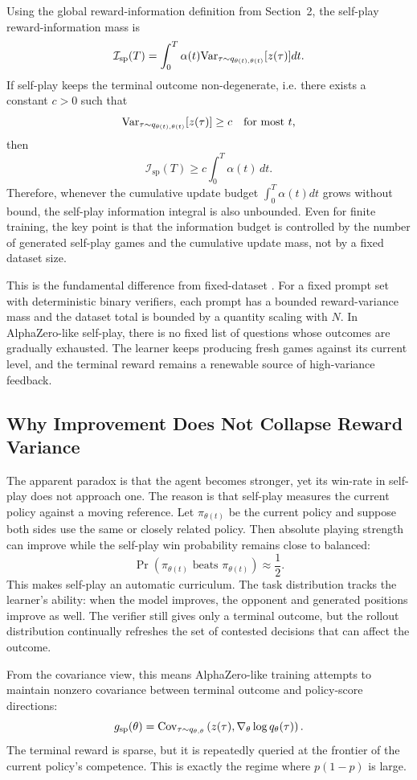 Using the global reward-information definition from Section~2, the self-play reward-information mass is
\[
  \mathcal{I}_{\mathrm{sp}}(T)
  =
  \int_0^T
  \alpha(t)
  \mathrm{Var}_{\tau\sim q_{\theta(t),\theta(t)}}[z(\tau)]
  dt.
\]
If self-play keeps the terminal outcome non-degenerate, i.e. there exists a constant $c>0$ such that
\[
  \mathrm{Var}_{\tau\sim q_{\theta(t),\theta(t)}}[z(\tau)]\ge c
  \quad
  \text{for most }t,
\]
then
\[
  \mathcal{I}_{\mathrm{sp}}(T)
  \ge
  c\int_0^T \alpha(t)\,dt.
\]
Therefore, whenever the cumulative update budget $\int_0^T\alpha(t)dt$ grows without bound, the self-play information integral is also unbounded. Even for finite training, the key point is that the information budget is controlled by the number of generated self-play games and the cumulative update mass, not by a fixed dataset size.

This is the fundamental difference from fixed-dataset \llm{} \rlvr{}. For a fixed prompt set with deterministic binary verifiers, each prompt has a bounded reward-variance mass and the dataset total is bounded by a quantity scaling with $N$. In AlphaZero-like self-play, there is no fixed list of questions whose outcomes are gradually exhausted. The learner keeps producing fresh games against its current level, and the terminal reward remains a renewable source of high-variance feedback.

\subsection{Why Improvement Does Not Collapse Reward Variance}

The apparent paradox is that the agent becomes stronger, yet its win-rate in self-play does not approach one. The reason is that self-play measures the current policy against a moving reference. Let $\pi_{\theta(t)}$ be the current policy and suppose both sides use the same or closely related policy. Then absolute playing strength can improve while the self-play win probability remains close to balanced:
\[
  \Pr(\pi_{\theta(t)} \text{ beats } \pi_{\theta(t)}) \approx \frac{1}{2}.
\]
This makes self-play an automatic curriculum. The task distribution tracks the learner's ability: when the model improves, the opponent and generated positions improve as well. The verifier still gives only a terminal outcome, but the rollout distribution continually refreshes the set of contested decisions that can affect the outcome.

From the covariance view, this means AlphaZero-like training attempts to maintain nonzero covariance between terminal outcome and policy-score directions:
\[
  g_{\mathrm{sp}}(\theta)
  =
  \mathrm{Cov}_{\tau\sim q_{\theta,\theta}}
  \left(
    z(\tau),
    \nabla_\theta \log q_\theta(\tau)
  \right).
\]
The terminal reward is sparse, but it is repeatedly queried at the frontier of the current policy's competence. This is exactly the regime where $p(1-p)$ is large.

